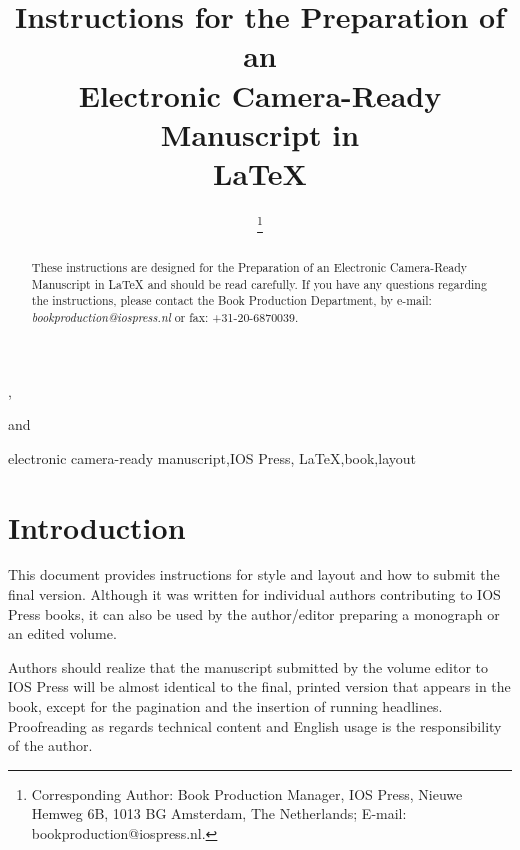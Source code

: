 \documentclass{IOS-Book-Article}
\begin{document}
\begin{frontmatter}              %

\title{Instructions for the Preparation of an\\
Electronic Camera-Ready Manuscript in\\ \LaTeX}

\author[A]{ %
\thanks{Corresponding Author: Book Production Manager, IOS Press, Nieuwe Hemweg 6B,
1013 BG Amsterdam, The Netherlands; E-mail:
bookproduction@iospress.nl.}},
\author[B]{ }
and
\author[B]{ }

\address[A]{Book Production Department, IOS Press, The Netherlands}
\address[B]{Short Affiliation of Second Author and Third Author}

\begin{abstract}
These instructions are designed for the Preparation of an Electronic
Camera-Ready Manuscript in \LaTeX{} and should be read carefully. If you
have any questions regarding the instructions, please contact the Book
Production Department, by e-mail: \textit{bookproduction@iospress.nl}
or fax: +31-20-6870039.
\end{abstract}

\begin{keyword}
electronic camera-ready manuscript\sep IOS Press\sep
\LaTeX\sep book\sep layout
\end{keyword}
\end{frontmatter}

\thispagestyle{empty}
\pagestyle{empty}

\section*{Introduction}
This document provides instructions for style and layout and how to submit the final
version. Although it was written for individual authors contributing to IOS Press books,
it can also be used by the author/editor preparing a monograph or an edited volume.

Authors should realize that the manuscript submitted by the volume editor to IOS
Press will be almost identical to the final, printed version that appears in the book,
except for the pagination and the insertion of running headlines. Proofreading as
regards technical content and English usage is the responsibility of the author.
\end{document}
